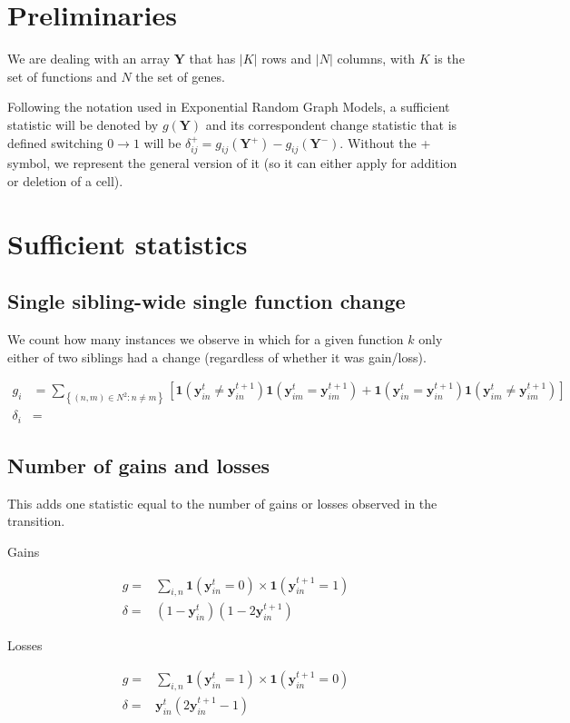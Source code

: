 \documentclass{article}
\newcommand{\Y}{\mathbf{Y}{}}
\newcommand{\y}[2]{\mathbf{y}_{#1}^{#2}}
\newcommand{\one}[1]{\mathbf{1}\left(#1\right)}
\newcommand{\set}[1]{\left\{#1\right\}}
\begin{document}
\section{Preliminaries}

We are dealing with an array $\Y$ that has $|K|$ rows and $|N|$ columns, with $K$ is the set of functions and $N$ the set of genes.

Following the notation used in Exponential Random Graph Models, a sufficient statistic will be denoted by $g(\Y)$ and its correspondent change statistic that is defined switching $0\to1$ will be $\delta_{ij}^+ = g_{ij}(\Y^+) - g_{ij}(\Y^-)$. Without the + symbol, we represent the general version of it (so it can either apply for addition or deletion of a cell).

\section{Sufficient statistics}

\subsection{Single sibling-wide single function change}

We count how many instances we observe in which for a given function $k$ only either of two siblings had a change (regardless of whether it was gain/loss). 

\begin{align}
	g_i & = \sum_{\set{(n,m) \in N^2: n\neq m}}\left[\one{\y{in}{t}\neq\y{in}{t+1}}\one{\y{im}{t}=\y{im}{t+1}} + \one{\y{in}{t}=\y{in}{t+1}}\one{\y{im}{t}\neq\y{im}{t+1}}\right] \\
	\delta_i & =
\end{align}


\subsection{Number of gains and losses}

This adds one statistic equal to the number of gains or losses observed in the transition.

Gains

\begin{align}
g = & \sum_{i,n}\one{\y{in}{t} =0}\times\one{\y{in}{t+1}=1} \\
\delta = & (1 - \y{in}{t})(1 - 2\y{in}{t+1})
\end{align}

Losses

\begin{align}
g = & \sum_{i,n}\one{\y{in}{t} =1}\times\one{\y{in}{t+1}=0} \\
\delta = & \y{in}{t}(2\y{in}{t+1} - 1)
\end{align}
\end{document}
